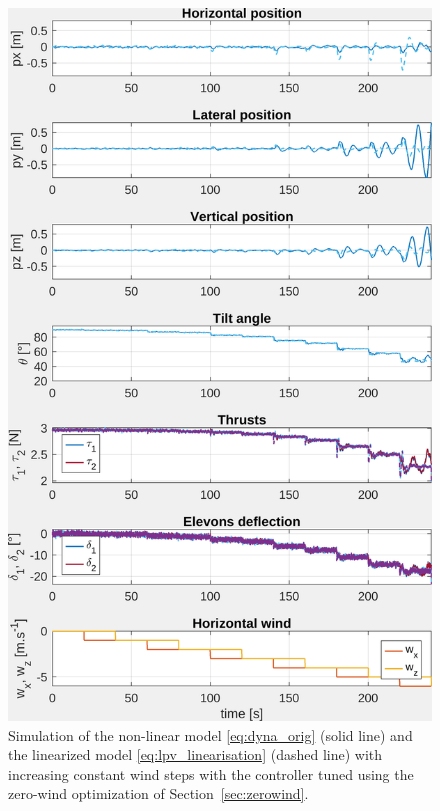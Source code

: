 \begin{figure}[b!]
    \centering
    \includegraphics[trim=0cm 0cm 0cm 0cm,clip,width=0.9\columnwidth]{figures/sim_systune_zero_wind.png}
    \caption{Simulation of the non-linear model \eqref{eq:dyna_orig} (solid line) and the linearized model \eqref{eq:lpv_linearisation} (dashed line) with increasing constant wind steps with the controller tuned using the zero-wind optimization of Section~\ref{sec:zerowind}.}
    \label{fig:SimSytuneStruct_zero}
\end{figure}

